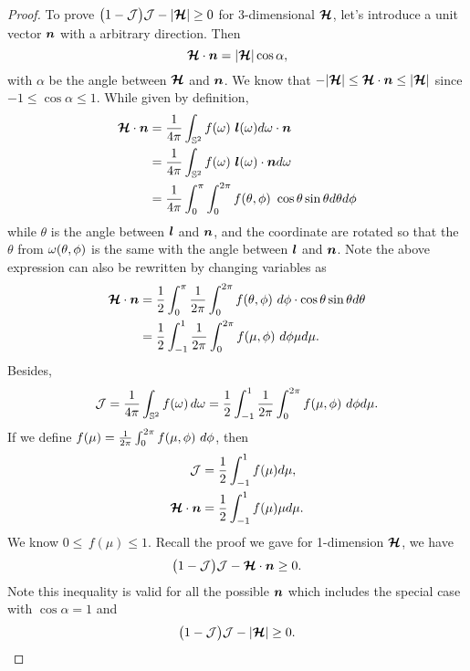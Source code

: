 \begin{proof}
    To prove $\big(1-\mathcal{J}\big)\mathcal{J}-|\boldsymbol{\mathcal{H}}|\ge0$ for 3-dimensional $\boldsymbol{\mathcal{H}}$, let's introduce a unit vector $\boldsymbol{n}$ with a arbitrary direction.
    Then 
    \begin{equation}
    \boldsymbol{\mathcal{H}} \cdot \boldsymbol{n} = |\boldsymbol{\mathcal{H}}| \cos\alpha,
    \end{equation}
    with $\alpha$ be the angle between $\boldsymbol{\mathcal{H}}$ and $\boldsymbol{n}$. 
    We know that $-|\boldsymbol{\mathcal{H}}|\leq\boldsymbol{\mathcal{H}} \cdot \boldsymbol{n}\leq|\boldsymbol{\mathcal{H}}|$ since $-1\leq\cos\alpha\leq1$.
    While given by definition,
    \begin{align}
    \vect{\cH} \cdot \bn & = \f{1}{4\pi}\int_{\bbS^{2}}f(\omegaNu)\ \bl(\omegaNu) d\omegaNu \cdot \bn \nonumber \\
     &= \f{1}{4\pi}\int_{\bbS^{2}}f(\omegaNu)\ \bl(\omegaNu) \cdot \bn d\omegaNu \nonumber \\
     &= \f{1}{4\pi}\int_{0}^{\pi}\int_{0}^{2\pi}f(\theta,\phi)\ \cos \theta \sin\theta d\theta d\phi
    \end{align}
    while $\theta$ is the angle between $\boldsymbol{l}$ and $\boldsymbol{n}$, and the coordinate are rotated so that the $\theta$ from $\omega(\theta,\phi)$ is the same with the angle between $\boldsymbol{l}$ and $\boldsymbol{n}$.
    Note the above expression can also be rewritten by changing variables as
    \begin{align}
    \boldsymbol{\mathcal{H}} \cdot \boldsymbol{n} & = \frac{1}{2}\int_{0}^{\pi} \frac{1}{2\pi}\int_{0}^{2\pi}f(\theta,\phi)\ d\phi \cdot \cos \theta \sin\theta d\theta  \\
    & =  \frac{1}{2}\int_{-1}^{1} \frac{1}{2\pi}\int_{0}^{2\pi}f(\mu,\phi)\ d\phi \mu d\mu.
    \end{align}
    Besides,
    \begin{align}
    \mathcal{J} = \frac{1}{4\pi}\int_{\mathbb{S}^{2}}f(\omega)\,d\omega = \frac{1}{2}\int_{-1}^{1} \frac{1}{2\pi}\int_{0}^{2\pi}f(\mu,\phi)\ d\phi d\mu.
    \end{align}
    If we define $f(\mu) =  \frac{1}{2\pi}\int_{0}^{2\pi}f(\mu,\phi)\ d\phi$, then
    \begin{align}
    \mathcal{J} &= \frac{1}{2}\int_{-1}^{1} f(\mu) d\mu, \\
    \boldsymbol{\mathcal{H}} \cdot \boldsymbol{n}  &= \frac{1}{2}\int_{-1}^{1} f(\mu) \mu d\mu.
    \end{align}
    We know $0\leq\,f(\mu)\leq1$.
    Recall the proof we gave for 1-dimension $\boldsymbol{\mathcal{H}}$, we have
    \begin{equation}
     \big(1-\mathcal{J}\big)\mathcal{J}-\boldsymbol{\mathcal{H}} \cdot \boldsymbol{n}\ge0.
    \end{equation}
    Note this inequality is valid for all the possible $\boldsymbol{n}$ which includes the special case with $\cos\alpha=1$ and
    \begin{equation}
    \big(1-\mathcal{J}\big)\mathcal{J}-|\boldsymbol{\mathcal{H}}|\ge0.
    \end{equation} 
\end{proof}

